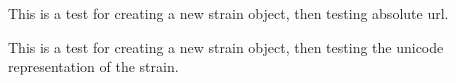 \documentclass[letterpaper,10pt,english]{sphinxmanual}
\begin{document}
\begin{fulllineitems}
\begin{fulllineitems}
\label{api:mousedb.animal.tests.StrainModelTests.test_strain_absolute_url}
This is a test for creating a new strain object, then testing absolute url.

\end{fulllineitems}


\begin{fulllineitems}
\label{api:mousedb.animal.tests.StrainModelTests.test_strain_unicode}
This is a test for creating a new strain object, then testing the unicode representation of the strain.

\end{fulllineitems}


\end{fulllineitems}

\end{document}
